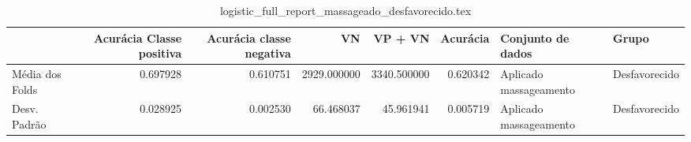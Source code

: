 \begin{table}
\centering
\caption{logistic_full_report_massageado_desfavorecido.tex}
\label{logistic_full_report_massageado_desfavorecido.tex}
\begin{tabular}{lrrrrrll}
\toprule
{}              &  Acurácia Classe positiva &  Acurácia classe negativa &          VN  &     VP + VN  &  Acurácia &       Conjunto de dados &          Grupo \\
\midrule
Média dos Folds &                  0.697928 &                  0.610751 &  2929.000000 &  3340.500000 &  0.620342 &  Aplicado massageamento &  Desfavorecido \\
Desv. Padrão    &                  0.028925 &                  0.002530 &    66.468037 &    45.961941 &  0.005719 &  Aplicado massageamento &  Desfavorecido \\
\bottomrule
\end{tabular}
\end{table}
